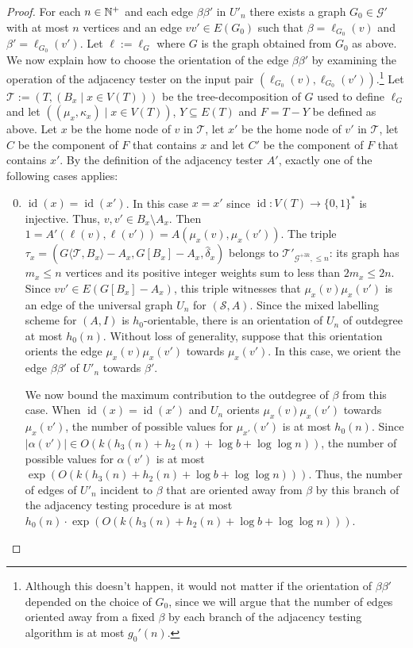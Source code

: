 \documentclass{patmorin}
\renewcommand{\le}{\leqslant}
\DeclareMathOperator{\id}{id}
\newcommand{\torso}[2]{{#1}\langle{#2}\rangle}
\newcommand{\Oh}{O}
\newcommand{\calG}{\mathcal{G}}
\newcommand{\calS}{\mathcal{S}}
\newcommand{\calT}{\mathcal{T}}
\begin{document}
\begin{proof}
  For each $n\in\mathbb{N}^+$ and each edge $\beta\beta'$ in $U'_n$ there exists
  a graph $G_0\in\calG'$ with at most $n$ vertices and an edge $vv'\in E(G_0)$ such that $\beta=\ell_{G_0}(v)$ and $\beta'=\ell_{G_0}(v')$. Let $\ell:=\ell_G$ where $G$ is the graph obtained from $G_0$ as above.  We now explain how to choose the orientation of the edge $\beta\beta'$ by examining the operation of the adjacency tester on the input pair $(\ell_{G_0}(v),\ell_{G_0}(v'))$.\footnote{Although this doesn't happen, it would not matter if the orientation of $\beta\beta'$ depended on the choice of $G_0$, since we will argue that the number of edges oriented away from a fixed $\beta$ by each branch of the adjacency testing algorithm is at most $g_0'(n)$.} Let $\calT:=(T,(B_x\mid x\in V(T)))$ be the tree-decomposition of $G$ used to define $\ell_G$ and let $((\mu_x,\kappa_x)\mid x\in V(T))$, $Y\subseteq E(T)$ and $F=T-Y$ be defined as above.  Let $x$ be the home node of $v$ in $\calT$, let $x'$ be the home node of $v'$ in $\calT$, let $C$ be the component of $F$ that contains $x$ and let $C'$ be the component of $F$ that contains $x'$.  By the definition of the adjacency tester $A'$, exactly one of the following cases applies:
  \begin{enumerate}\setcounter{enumi}{-1}
    \item $\id(x)=\id(x')$. In this case $x=x'$ since $\id:V(T)\to\{0,1\}^*$ is injective.  Thus, $v,v'\in B_x\setminus A_x$.  Then $1=A'(\ell(v),\ell(v'))=A(\mu_x(v),\mu_x(v'))$.    The triple $\tau_x=(\torso{G}{\calT,B_x}-A_x,G[B_x]-A_x,\widehat\delta_x)$ belongs to $\calT'_{\calG^{+3k},\le n}$: its graph has $m_x\le n$ vertices and its positive integer weights sum to less than $2m_x\le 2n$. Since $vv'\in E(G[B_x]-A_x)$, this triple witnesses that $\mu_x(v)\mu_x(v')$ is an edge of the universal graph $U_n$ for $(\calS,A)$.  Since the mixed labelling scheme for $(A,I)$ is $h_0$-orientable, there is an orientation of $U_{n}$ of outdegree at most $h_0(n)$.  Without loss of generality, suppose that this orientation orients the edge $\mu_x(v)\mu_x(v')$ towards $\mu_x(v')$.  In this case, we orient the edge $\beta\beta'$ of $U'_n$ towards $\beta'$.
    
    We now bound the maximum contribution to the outdegree of $\beta$ from this case. When $\id(x)=\id(x')$ and $U_n$ orients $\mu_x(v)\mu_x(v')$ towards $\mu_x(v')$, the number of possible values for $\mu_{x'}(v')$ is at most $h_0(n)$.   Since $|\alpha(v')|\in \Oh(k(h_3(n)+h_2(n)+\log b+\log\log n))$, the number of possible values for $\alpha(v')$ is at most  $\exp(\Oh(k(h_3(n)+h_2(n)+\log b+\log\log n)))$.  Thus, the number of edges of $U'_n$ incident to $\beta$ that are oriented away from $\beta$ by this branch of the adjacency testing procedure is at most $h_0(n)\cdot\exp(\Oh(k(h_3(n)+h_2(n)+\log b+\log\log n)))$.
    

\end{enumerate}
\end{proof}
\end{document}
